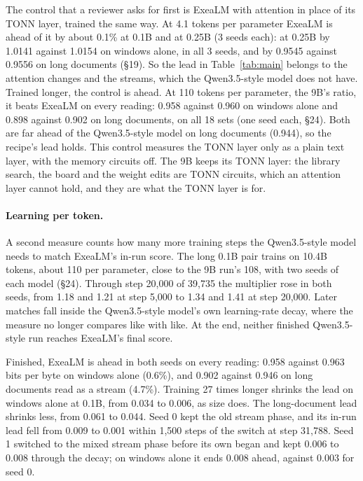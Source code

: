 \documentclass[11pt,letterpaper]{article}
\newcommand{\sect}[1]{\S#1}
\begin{document}
The control that a reviewer asks for first is ExeaLM with attention in place of its TONN layer, trained the same way.
At 4.1 tokens per parameter ExeaLM is ahead of it by about 0.1\% at 0.1B and at 0.25B (3 seeds each): at 0.25B by 1.0141 against 1.0154 on windows alone, in all 3 seeds, and by 0.9545 against 0.9556 on long documents (\sect{19}).
So the lead in Table~\ref{tab:main} belongs to the attention changes and the streams, which the Qwen3.5-style model does not have.
Trained longer, the control is ahead. At 110 tokens per parameter, the 9B's ratio, it beats ExeaLM on every reading: 0.958 against 0.960 on windows alone and 0.898 against 0.902 on long documents, on all 18 sets (one seed each, \sect{24}).
Both are far ahead of the Qwen3.5-style model on long documents (0.944), so the recipe's lead holds.
This control measures the TONN layer only as a plain text layer, with the memory circuits off.
The 9B keeps its TONN layer: the library search, the board and the weight edits are TONN circuits, which an attention layer cannot hold, and they are what the TONN layer is for.

\paragraph{Learning per token.}
A second measure counts how many more training steps the Qwen3.5-style model needs to match ExeaLM's in-run score.
The long 0.1B pair trains on 10.4B tokens, about 110 per parameter, close to the 9B run's 108, with two seeds of each model (\sect{24}).
Through step 20,000 of 39,735 the multiplier rose in both seeds, from 1.18 and 1.21 at step 5,000 to 1.34 and 1.41 at step 20,000.
Later matches fall inside the Qwen3.5-style model's own learning-rate decay, where the measure no longer compares like with like.
At the end, neither finished Qwen3.5-style run reaches ExeaLM's final score.

Finished, ExeaLM is ahead in both seeds on every reading: 0.958 against 0.963 bits per byte on windows alone (0.6\%), and 0.902 against 0.946 on long documents read as a stream (4.7\%).
Training 27 times longer shrinks the lead on windows alone at 0.1B, from 0.034 to 0.006, as size does.
The long-document lead shrinks less, from 0.061 to 0.044.
Seed 0 kept the old stream phase, and its in-run lead fell from 0.009 to 0.001 within 1,500 steps of the switch at step 31,788.
Seed 1 switched to the mixed stream phase before its own began and kept 0.006 to 0.008 through the decay; on windows alone it ends 0.008 ahead, against 0.003 for seed 0.
\end{document}
